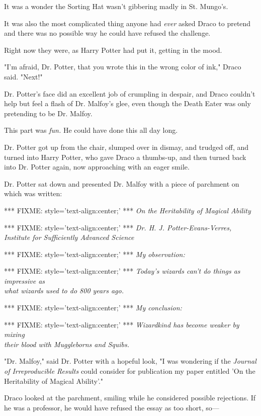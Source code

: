 It was a wonder the Sorting Hat wasn't gibbering madly in St. Mungo's.

It was also the most complicated thing anyone had \emph{ever} asked Draco to 
pretend and there was no possible way he could have refused the challenge.

Right now they were, as Harry Potter had put it, getting in the mood.

"I'm afraid, Dr. Potter, that you wrote this in the wrong color of ink," Draco 
said. "Next!"

Dr. Potter's face did an excellent job of crumpling in despair, and Draco 
couldn't help but feel a flash of Dr. Malfoy's glee, even though the Death 
Eater was only pretending to be Dr. Malfoy.

This part was \emph{fun.} He could have done this all day long.

Dr. Potter got up from the chair, slumped over in dismay, and trudged off, and 
turned into Harry Potter, who gave Draco a thumbs-up, and then turned back into 
Dr. Potter again, now approaching with an eager smile.

Dr. Potter sat down and presented Dr. Malfoy with a piece of parchment on which 
was written:

*** FIXME: style='text-align:center;' ***
\emph{On the Heritability of Magical Ability}

*** FIXME: style='text-align:center;' ***
\emph{Dr. H. J. Potter-Evans-Verres, Institute for Sufficiently Advanced 
Science}

*** FIXME: style='text-align:center;' ***
\emph{My observation:}

*** FIXME: style='text-align:center;' ***
\emph{Today's wizards can't do things as impressive as\\
what wizards used to do 800 years ago.}

*** FIXME: style='text-align:center;' ***
\emph{My conclusion:}

*** FIXME: style='text-align:center;' ***
\emph{Wizardkind has become weaker by mixing\\
their blood with Muggleborns and Squibs.}

"Dr. Malfoy," said Dr. Potter with a hopeful look, "I was wondering if the 
\emph{Journal of Irreproducible Results} could consider for publication my 
paper entitled 'On the Heritability of Magical Ability'."

Draco looked at the parchment, smiling while he considered possible rejections. 
If he was a professor, he would have refused the essay as too short, so---

